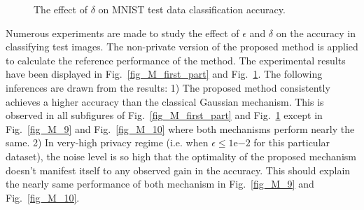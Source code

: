 \begin{figure}
\centerline{  \hfil {}}
\caption{The effect of $\delta$ on MNIST test data classification accuracy.}\label{fig_M_second_part}
\end{figure}

Numerous experiments are made to study the effect of $\epsilon$ and $\delta$ on the accuracy in classifying test images. The non-private version of the proposed method is applied to calculate the reference performance of the method. The experimental results have been displayed in Fig.~\ref{fig_M_first_part} and Fig.~\ref{fig_M_second_part}. The following inferences are drawn from the results: 1) The proposed method consistently achieves a higher accuracy than the classical Gaussian mechanism. This is observed in all subfigures of Fig.~\ref{fig_M_first_part} and Fig.~\ref{fig_M_second_part} except in Fig.~\ref{fig_M_9} and Fig.~\ref{fig_M_10} where both mechanisms perform nearly the same. 2) In very-high privacy regime (i.e. when $\epsilon \leq 1\mathrm{e}{-2}$ for this particular dataset), the noise level is so high that the optimality of the proposed mechanism doesn't manifest itself to any observed gain in the accuracy. This should explain the nearly same performance of both mechanism in Fig.~\ref{fig_M_9} and Fig.~\ref{fig_M_10}. 

